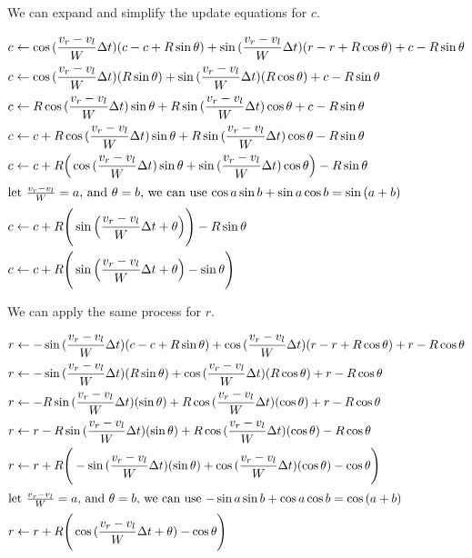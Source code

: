 \documentclass{article}
\begin{document}
We can expand and simplify the update equations for $c$.

\begin{align}
  c &\leftarrow \cos{(\frac{v_r-v_l}{W}\Delta t)}(c-c+R\sin{\theta})+\sin{(\frac{v_r-v_l}{W}\Delta t)}(r-r+R\cos{\theta}) + c-R\sin{\theta} \\
  c &\leftarrow \cos{(\frac{v_r-v_l}{W}\Delta t)}(R\sin{\theta})+\sin{(\frac{v_r-v_l}{W}\Delta t)}(R\cos{\theta}) + c-R\sin{\theta} \\
  c &\leftarrow R\cos{(\frac{v_r-v_l}{W}\Delta t)}\sin{\theta}+R\sin{(\frac{v_r-v_l}{W}\Delta t)}\cos{\theta} + c-R\sin{\theta} \\
  c &\leftarrow c+R\cos{(\frac{v_r-v_l}{W}\Delta t)}\sin{\theta}+R\sin{(\frac{v_r-v_l}{W}\Delta t)}\cos{\theta}-R\sin{\theta} \\
  c &\leftarrow c+R\Big(\cos{(\frac{v_r-v_l}{W}\Delta t)}\sin{\theta}+\sin{(\frac{v_r-v_l}{W}\Delta t)}\cos{\theta}\Big)-R\sin{\theta} \\
  \shortintertext{let $\frac{v_r-v_l}{W}=a$, and $\theta=b$, we can use $\cos{a}\sin{b}+\sin{a}\cos{b}=\sin{(a+b)}$}
  c &\leftarrow c+R\Bigg(\sin{\Big(\frac{v_r-v_l}{W}\Delta t+\theta}\Big)\Bigg)-R\sin{\theta} \\
  c &\leftarrow c+R\Bigg(\sin{\Big(\frac{v_r-v_l}{W}\Delta t+\theta}\Big)-\sin{\theta}\Bigg)
\end{align}

We can apply the same process for $r$.

\begin{align}
  r &\leftarrow -\sin{(\frac{v_r-v_l}{W}\Delta t)}(c-c+R\sin{\theta})+\cos{(\frac{v_r-v_l}{W}\Delta t)}(r-r+R\cos{\theta}) + r-R\cos{\theta} \\
  r &\leftarrow -\sin{(\frac{v_r-v_l}{W}\Delta t)}(R\sin{\theta})+\cos{(\frac{v_r-v_l}{W}\Delta t)}(R\cos{\theta}) + r-R\cos{\theta} \\
  r &\leftarrow -R\sin{(\frac{v_r-v_l}{W}\Delta t)}(\sin{\theta})+R\cos{(\frac{v_r-v_l}{W}\Delta t)}(\cos{\theta}) + r-R\cos{\theta} \\
  r &\leftarrow r -R\sin{(\frac{v_r-v_l}{W}\Delta t)}(\sin{\theta})+R\cos{(\frac{v_r-v_l}{W}\Delta t)}(\cos{\theta}) - R\cos{\theta} \\
  r &\leftarrow r + R\Bigg(-\sin{(\frac{v_r-v_l}{W}\Delta t)}(\sin{\theta})+\cos{(\frac{v_r-v_l}{W}\Delta t)}(\cos{\theta}) - \cos{\theta}\Bigg) \\
  \shortintertext{let $\frac{v_r-v_l}{W}=a$, and $\theta=b$, we can use $-\sin{a}\sin{b}+\cos{a}\cos{b}=\cos{(a+b)}$}
  r &\leftarrow r + R\Bigg(\cos{(\frac{v_r-v_l}{W}\Delta t + \theta)} - \cos{\theta}\Bigg)
\end{align}
\end{document}

